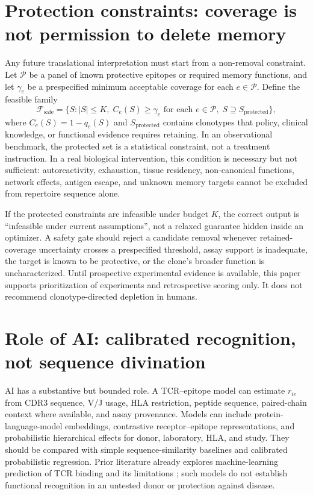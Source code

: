 \documentclass[11pt]{article}
\begin{document}
\section{Protection constraints: coverage is not permission to delete memory}
Any future translational interpretation must start from a non-removal constraint. Let $\mathcal{P}$ be a panel of known protective epitopes or required memory functions, and let $\gamma_e$ be a prespecified minimum acceptable coverage for each $e\in\mathcal{P}$. Define the feasible family
\begin{equation}
\mathcal{F}_{\mathrm{safe}}=\{S:|S|\leq K,\; C_e(S)\geq\gamma_e\text{ for each }e\in\mathcal{P},\; S\supseteq S_{\mathrm{protected}}\},
\label{eq:safety}
\end{equation}
where $C_e(S)=1-q_e(S)$ and $S_{\mathrm{protected}}$ contains clonotypes that policy, clinical knowledge, or functional evidence requires retaining. In an observational benchmark, the protected set is a statistical constraint, not a treatment instruction. In a real biological intervention, this condition is necessary but not sufficient: autoreactivity, exhaustion, tissue residency, non-canonical functions, network effects, antigen escape, and unknown memory targets cannot be excluded from repertoire sequence alone.

If the protected constraints are infeasible under budget $K$, the correct output is ``infeasible under current assumptions'', not a relaxed guarantee hidden inside an optimizer. A safety gate should reject a candidate removal whenever retained-coverage uncertainty crosses a prespecified threshold, assay support is inadequate, the target is known to be protective, or the clone's broader function is uncharacterized. Until prospective experimental evidence is available, this paper supports prioritization of experiments and retrospective scoring only. It does not recommend clonotype-directed depletion in humans.

\section{Role of AI: calibrated recognition, not sequence divination}
AI has a substantive but bounded role. A TCR--epitope model can estimate $r_{ie}$ from CDR3 sequence, V/J usage, HLA restriction, peptide sequence, paired-chain context where available, and assay provenance. Models can include protein-language-model embeddings, contrastive receptor--epitope representations, and probabilistic hierarchical effects for donor, laboratory, HLA, and study. They should be compared with simple sequence-similarity baselines and calibrated probabilistic regression. Prior literature already explores machine-learning prediction of TCR binding and its limitations \citep{Weber2024}; such models do not establish functional recognition in an untested donor or protection against disease.
\end{document}
